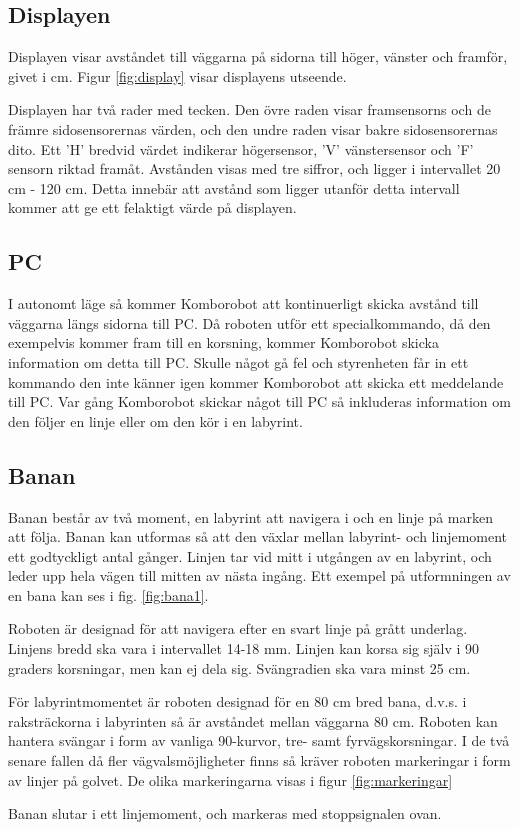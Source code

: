 \subsection{Displayen}
Displayen visar avståndet till väggarna på sidorna till höger, vänster och framför, givet i cm. Figur \ref{fig:display} visar displayens utseende. 


Displayen har två rader med tecken. Den övre raden visar framsensorns och de främre sidosensorernas värden, och den undre raden visar bakre sidosensorernas dito. Ett 'H' bredvid värdet indikerar högersensor, 'V' vänstersensor och 'F' sensorn riktad framåt. Avstånden visas med tre siffror, och ligger i intervallet 20 cm - 120 cm. Detta innebär att avstånd som ligger utanför detta intervall kommer att ge ett felaktigt värde på displayen. 

\subsection{PC}
I autonomt läge så kommer Komborobot att kontinuerligt skicka avstånd till
väggarna längs sidorna till PC. Då roboten utför ett specialkommando, då den
exempelvis kommer fram till en korsning,  kommer Komborobot skicka information om
detta till PC. Skulle något gå fel och styrenheten får in ett kommando den inte
känner igen kommer Komborobot att skicka ett meddelande till PC. Var gång
Komborobot skickar något till PC så inkluderas information om den följer en
linje eller om den kör i en labyrint.
\subsection{Banan}
\label{sec:banan}

Banan består av två moment, en labyrint att navigera i och en linje på marken att följa. Banan kan utformas så att den växlar mellan labyrint- och linjemoment ett godtyckligt antal gånger. Linjen tar vid mitt i utgången av en labyrint, och leder upp hela vägen till mitten av nästa ingång. Ett exempel på utformningen av en bana kan ses i fig. \ref{fig:bana1}.


Roboten är designad för att navigera efter en svart linje på grått underlag. Linjens bredd ska vara i intervallet 14-18 mm. Linjen kan korsa sig själv i 90 graders korsningar, men kan ej dela sig. Svängradien ska vara minst 25 cm. 

För labyrintmomentet är roboten designad för en 80 cm bred bana, d.v.s. i raksträckorna i labyrinten så är avståndet mellan väggarna 80 cm. Roboten kan hantera svängar i form av vanliga 90\degree-kurvor, tre- samt fyrvägskorsningar. I de två senare fallen då fler vägvalsmöjligheter finns så kräver roboten markeringar i form av linjer på golvet. De olika markeringarna visas i figur \ref{fig:markeringar}


Banan slutar i ett linjemoment, och markeras med stoppsignalen ovan. 

